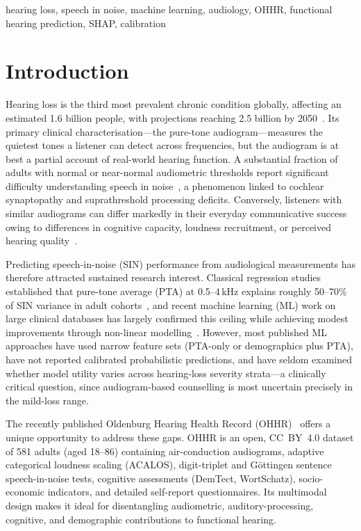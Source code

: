 \documentclass[conference]{IEEEtran}
\begin{document}
\begin{IEEEkeywords}
hearing loss, speech in noise, machine learning, audiology, OHHR,
functional hearing prediction, SHAP, calibration
\end{IEEEkeywords}

\section{Introduction}

Hearing loss is the third most prevalent chronic condition globally, affecting
an estimated 1.6 billion people, with projections reaching 2.5 billion by
2050~\cite{who2021}.  Its primary clinical characterisation---the pure-tone
audiogram---measures the quietest tones a listener can detect across
frequencies, but the audiogram is at best a partial account of real-world
hearing function.  A substantial fraction of adults with normal or
near-normal audiometric thresholds report significant difficulty understanding
speech in noise~\cite{Plack2014HiddenHL}, a phenomenon linked to
cochlear synaptopathy and suprathreshold processing deficits.  Conversely,
listeners with similar audiograms can differ markedly in their everyday
communicative success owing to differences in cognitive capacity, loudness
recruitment, or perceived hearing quality~\cite{Gatehouse2004SSQ}.

Predicting speech-in-noise (SIN) performance from audiological measurements
has therefore attracted sustained research interest.  Classical regression
studies established that pure-tone average (PTA) at 0.5--4\,kHz explains
roughly 50--70\% of SIN variance in adult cohorts~\cite{Smoorenburg1992},
and recent machine learning (ML) work on large clinical databases has largely
confirmed this ceiling while achieving modest improvements through
non-linear modelling~\cite{Gathman2023}.  However, most published ML
approaches have used narrow feature sets (PTA-only or demographics plus PTA),
have not reported calibrated probabilistic predictions, and have seldom
examined whether model utility varies across hearing-loss severity strata---a
clinically critical question, since audiogram-based counselling is most
uncertain precisely in the mild-loss range.

The recently published Oldenburg Hearing Health Record
(OHHR)~\cite{OHHR2025} offers a unique opportunity to address these gaps.
OHHR is an open, CC~BY~4.0 dataset of 581 adults (aged 18--86) containing
air-conduction audiograms, adaptive categorical loudness scaling (ACALOS),
digit-triplet and Göttingen sentence speech-in-noise tests,
cognitive assessments (DemTect, WortSchatz), socio-economic indicators, and
detailed self-report questionnaires.  Its multimodal design makes it ideal
for disentangling audiometric, auditory-processing, cognitive, and
demographic contributions to functional hearing.
\end{document}
